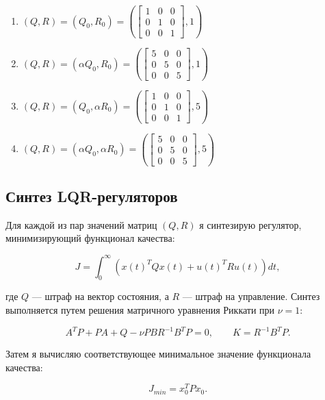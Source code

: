 \documentclass[a4paper,12pt]{article}
\begin{document}
	\begin{enumerate}
		\item $(Q, R) = (Q_0, R_0) = 
		\left(
		\begin{bmatrix}
			1 & 0 & 0 \\
			0 & 1 & 0 \\
			0 & 0 & 1
		\end{bmatrix}, 1
		\right)$
		
		\item $(Q, R) = (\alpha Q_0, R_0) = 
		\left(
		\begin{bmatrix}
			5 & 0 & 0 \\
			0 & 5 & 0 \\
			0 & 0 & 5
		\end{bmatrix}, 1
		\right)$
		
		\item $(Q, R) = (Q_0, \alpha R_0) = 
		\left(
		\begin{bmatrix}
			1 & 0 & 0 \\
			0 & 1 & 0 \\
			0 & 0 & 1
		\end{bmatrix}, 5
		\right)$
		
		\item $(Q, R) = (\alpha Q_0, \alpha R_0) = 
		\left(
		\begin{bmatrix}
			5 & 0 & 0 \\
			0 & 5 & 0 \\
			0 & 0 & 5
		\end{bmatrix}, 5
		\right)$
	\end{enumerate}
	
	
	\subsection{Синтез LQR-регуляторов}
	
	Для каждой из пар значений матриц $(Q, R)$ я синтезирую регулятор, минимизирующий функционал качества:
	
	\[
	J = \int_{0}^{\infty} \left( x(t)^T Q x(t) + u(t)^T R u(t) \right) dt,
	\]
	
	где $Q$ --- штраф на вектор состояния, а $R$ --- штраф на управление. Синтез выполняется путем решения матричного уравнения Риккати при $\nu = 1$:
	
	\[
	A^T P + P A + Q - \nu P B R^{-1} B^T P = 0, \qquad K = R^{-1} B^T P.
	\]
	
	Затем я вычисляю соответствующее минимальное значение функционала качества:
	
	\[
	J_{min} = x_0^T P x_0.
	\]
	
\end{document}
